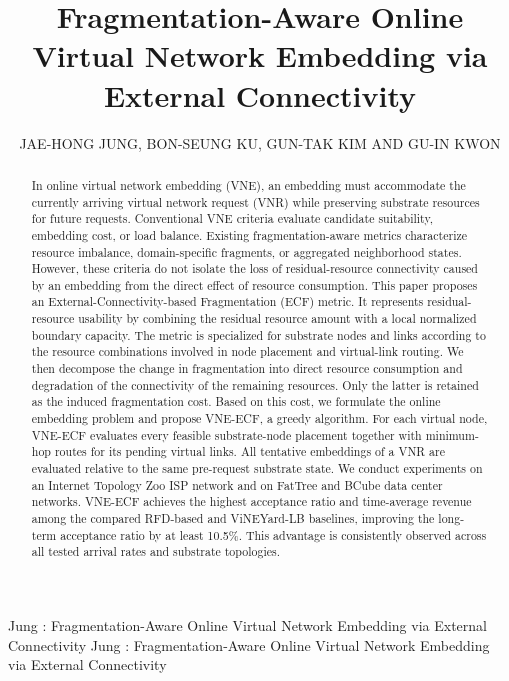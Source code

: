 \documentclass{ieeeaccess}
\newcommand{\ecf}{ECF}
\newcommand{\ecfvne}{VNE-ECF}
\begin{document}
\doi{} %

\title{Fragmentation-Aware Online Virtual Network Embedding via External Connectivity}

\author{\uppercase{Jae-Hong Jung}, \uppercase{Bon-Seung Ku}, \uppercase{Gun-Tak Kim} AND \uppercase{Gu-In Kwon}}

\address[1]{Department of Electrical and Computer Engineering, Inha University, 100 Inha-ro, Michuhol-gu, Incheon 22211, South Korea}

\markboth
{Jung \headeretal: Fragmentation-Aware Online Virtual Network Embedding via External Connectivity} %
{Jung \headeretal: Fragmentation-Aware Online Virtual Network Embedding via External Connectivity} %



\begin{abstract}
	
	In online virtual network embedding (VNE), an embedding must accommodate the currently arriving
	virtual network request (VNR) while preserving substrate resources for future requests.
	Conventional VNE criteria evaluate candidate suitability, embedding cost, or load balance.
	Existing fragmentation-aware metrics characterize resource imbalance, domain-specific fragments,
	or aggregated neighborhood states. However, these criteria do not isolate the loss of
	residual-resource connectivity caused by an embedding from the direct effect of resource
	consumption. This paper proposes an External-Connectivity-based Fragmentation (\ecf{}) metric.
	It represents residual-resource usability by combining the residual resource amount with a local
	normalized boundary capacity. The metric is specialized for substrate nodes and links according
	to the resource combinations involved in node placement and virtual-link routing. We then
	decompose the change in fragmentation into direct resource consumption and degradation of the
	connectivity of the remaining resources. Only the latter is retained as the induced fragmentation
	cost. Based on this cost, we formulate the online embedding problem and propose \ecfvne{}, a
	greedy algorithm. For each virtual node, \ecfvne{} evaluates every feasible substrate-node
	placement together with minimum-hop routes for its pending virtual links. All tentative
	embeddings of a VNR are evaluated relative to the same pre-request substrate state. We conduct
	experiments on an Internet Topology Zoo ISP network and on FatTree and BCube data center networks.
	\ecfvne{} achieves the highest acceptance ratio and time-average revenue among the compared RFD-based and ViNEYard-LB baselines, improving the long-term acceptance ratio by at least 10.5\%. This advantage is consistently observed across all tested arrival rates and substrate topologies.

	
\end{abstract}
\end{document}
